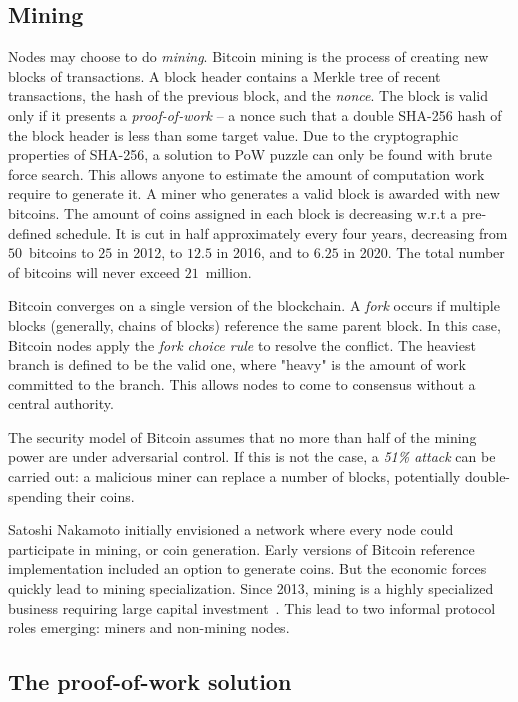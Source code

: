 \subsection{Mining}

Nodes may choose to do \textit{mining}.
Bitcoin mining is the process of creating new blocks of transactions.
A block header contains a Merkle tree of recent transactions, the hash of the previous block, and the \textit{nonce}.
The block is valid only if it presents a \textit{proof-of-work} -- a nonce such that a double SHA-256 hash of the block header is less than some target value.
Due to the cryptographic properties of SHA-256, a solution to PoW puzzle can only be found with brute force search.
This allows anyone to estimate the amount of computation work require to generate it.
A miner who generates a valid block is awarded with new bitcoins.
The amount of coins assigned in each block is decreasing w.r.t a pre-defined schedule.
It is cut in half approximately every four years, decreasing from $50$~bitcoins to $25$ in 2012, to $12.5$ in 2016, and to $6.25$ in 2020.
The total number of bitcoins will never exceed $21$~million.

Bitcoin converges on a single version of the blockchain.
A \textit{fork} occurs if multiple blocks (generally, chains of blocks) reference the same parent block.
In this case, Bitcoin nodes apply the \textit{fork choice rule} to resolve the conflict.
The heaviest branch is defined to be the valid one, where "heavy" is the amount of work committed to the branch.
This allows nodes to come to consensus without a central authority.

The security model of Bitcoin assumes that no more than half of the mining power are under adversarial control.
If this is not the case, a \textit{51\% attack} can be carried out: a malicious miner can replace a number of blocks, potentially double-spending their coins.

Satoshi Nakamoto initially envisioned a network where every node could participate in mining, or coin generation.
Early versions of Bitcoin reference implementation included an option to generate coins.
But the economic forces quickly lead to mining specialization.
Since 2013, mining is a highly specialized business requiring large capital investment~\cite{Kroll2013}.
This lead to two informal protocol roles emerging: miners and non-mining nodes.


\subsection{The proof-of-work solution}

